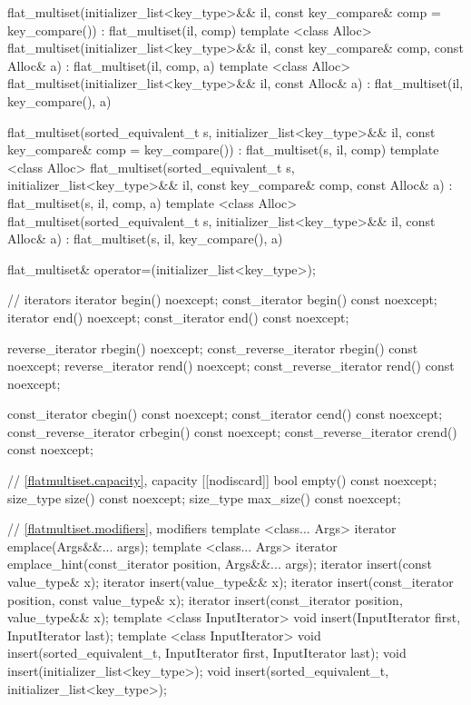 \begin{codeblock}
\begin{codeblock}
\begin{codeblock}
\begin{addedblock}
\begin{codeblock}
{    flat_multiset(initializer_list<key_type>&& il,
                  const key_compare& comp = key_compare())
      : flat_multiset(il, comp) { }
    template <class Alloc>
      flat_multiset(initializer_list<key_type>&& il,
                    const key_compare& comp, const Alloc& a)
        : flat_multiset(il, comp, a) { }
    template <class Alloc>
      flat_multiset(initializer_list<key_type>&& il, const Alloc& a)
        : flat_multiset(il, key_compare(), a) { }

    flat_multiset(sorted_equivalent_t s, initializer_list<key_type>&& il,
                  const key_compare& comp = key_compare())
        : flat_multiset(s, il, comp) { }
    template <class Alloc>
      flat_multiset(sorted_equivalent_t s, initializer_list<key_type>&& il,
                    const key_compare& comp, const Alloc& a)
        : flat_multiset(s, il, comp, a) { }
    template <class Alloc>
      flat_multiset(sorted_equivalent_t s, initializer_list<key_type>&& il,
                    const Alloc& a)
        : flat_multiset(s, il, key_compare(), a) { }

    flat_multiset& operator=(initializer_list<key_type>);

    // iterators
    iterator               begin() noexcept;
    const_iterator         begin() const noexcept;
    iterator               end() noexcept;
    const_iterator         end() const noexcept;

    reverse_iterator       rbegin() noexcept;
    const_reverse_iterator rbegin() const noexcept;
    reverse_iterator       rend() noexcept;
    const_reverse_iterator rend() const noexcept;

    const_iterator         cbegin() const noexcept;
    const_iterator         cend() const noexcept;
    const_reverse_iterator crbegin() const noexcept;
    const_reverse_iterator crend() const noexcept;

    // \ref{flatmultiset.capacity}, capacity
    [[nodiscard]] bool empty() const noexcept;
    size_type size() const noexcept;
    size_type max_size() const noexcept;

    // \ref{flatmultiset.modifiers}, modifiers
    template <class... Args> iterator emplace(Args&&... args);
    template <class... Args>
      iterator emplace_hint(const_iterator position, Args&&... args);
    iterator insert(const value_type& x);
    iterator insert(value_type&& x);
    iterator insert(const_iterator position, const value_type& x);
    iterator insert(const_iterator position, value_type&& x);
    template <class InputIterator>
      void insert(InputIterator first, InputIterator last);
    template <class InputIterator>
      void insert(sorted_equivalent_t, InputIterator first, InputIterator last);
    void insert(initializer_list<key_type>);
    void insert(sorted_equivalent_t, initializer_list<key_type>);

}
\end{codeblock}
\end{addedblock}
\end{codeblock}
\end{codeblock}
\end{codeblock}
